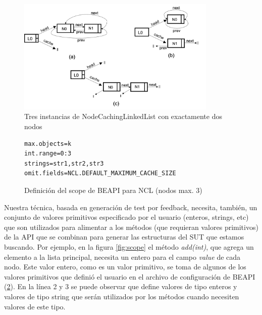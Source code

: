 \begin{figure}[H]
    \centering
    \includegraphics[width=0.85\textwidth]{images/NCL-instances.png}
    \caption{Tres instancias de NodeCachingLinkedList con exactamente dos nodos}
    \label{fig:ncl-instances}
\end{figure}

\begin{figure}[H]
\begin{lstlisting}[keywordstyle=\scriptsize\ttfamily]
max.objects=k
int.range=0:3
strings=str1,str2,str3
omit.fields=NCL.DEFAULT_MAXIMUM_CACHE_SIZE
\end{lstlisting}
\caption{Definición del scope de BEAPI para NCL (nodos max. 3)}
\label{fig:NCL-fin-BEAPI}
\end{figure}


Nuestra técnica, basada en generación de test por feedback, necesita, también, un conjunto de valores primitivos especificado por el usuario 
(enteros, strings, etc) que son utilizados para alimentar a los métodos (que requieran valores primitivos) de la API que se combinan para generar 
las estructuras del SUT que estamos buscando.
Por ejemplo, en la figura \ref{fig:scope} el método \emph{add(int)}, que agrega un elemento a la lista principal, 
necesita un entero para el campo \emph{value} de cada nodo. Este valor entero, como es un valor primitivo, 
se toma de algunos de los valores primitivos que definió el usuario en el archivo de configuración de BEAPI (\ref{fig:NCL-fin-BEAPI}). 
En la línea 2 y 3 se puede observar que define valores de tipo enteros y valores de tipo string que serán utilizados por los métodos 
cuando necesiten valores de este tipo. 
\\


